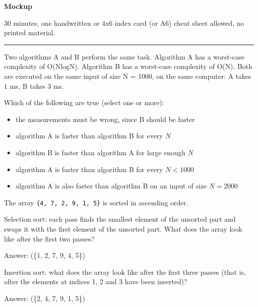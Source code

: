 {\Large\bfseries Mockup\par}
\bigskip

\fullname

30 minutes, one handwritten or 4x6 index card (or A6) cheat sheet allowed, no printed material.

\bigskip
\begin{center}\rule{0.4\linewidth}{0.4pt}\end{center}
\bigskip

\begin{question}
Two algorithms A and B perform the same task. Algorithm A has a worst-case complexity
of O(NlogN). Algorithm B has a worst-case complexity of O(N).
Both are executed on the same input of size N = 1000, on the same computer: A takes 1 ms, B takes 3 ms.

Which of the following are true (select one or more):
\begin{itemize}[leftmargin=2em,itemsep=1pt,topsep=2pt]
\item[\cb{0}] the measurements must be wrong, since B should be faster
\item[\cb{0}] algorithm A is faster than algorithm B for every $N$
\item[\cb{1}] algorithm B is faster than algorithm A for large enough $N$
\item[\cb{0}] algorithm A is faster than algorithm B for every $N < 1000$
\item[\cb{0}] algorithm A is also faster than algorithm B on an input of size $N = 2000$
\end{itemize}
\end{question}

\begin{question}
The array \lstinline|{4, 7, 2, 9, 1, 5}| is sorted in ascending order.

Selection sort: each pass finds the smallest element of the unsorted part and swaps it with the first element of the unsorted part.
What does the array look like after the first two passes?

Answer: \underline{\hspace{2in}} \ifanswers (\{1, 2, 7, 9, 4, 5\})\fi

Insertion sort: what does the array look like after the first three passes (that is, after the elements at indices 1, 2 and 3 have been inserted)?

Answer: \underline{\hspace{2in}} \ifanswers (\{2, 4, 7, 9, 1, 5\})\fi
\end{question}

